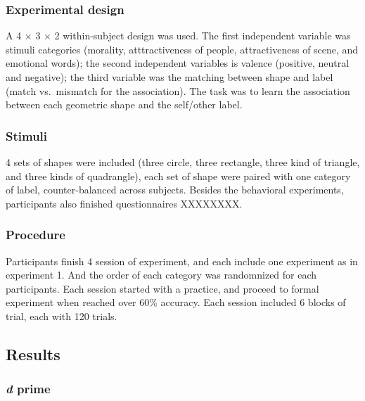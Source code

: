 \documentclass[man]{apa6}
\begin{document}
\hypertarget{experimental-design-2}{%
\subsubsection{Experimental design}\label{experimental-design-2}}

A 4 × 3 × 2 within-subject design was used. The first independent variable was stimuli categories (morality, atttractiveness of people, attractiveness of scene, and emotional words); the second independent variables is valence (positive, neutral and negative); the third variable was the matching between shape and label (match vs.~mismatch for the association). The task was to learn the association between each geometric shape and the self/other label.

\hypertarget{stimuli-3}{%
\subsubsection{Stimuli}\label{stimuli-3}}

4 sets of shapes were included (three circle, three rectangle, three kind of triangle, and three kinds of quadrangle), each set of shape were paired with one category of label, counter-balanced across subjects. Besides the behavioral experiments, participants also finished questionnaires XXXXXXXX.

\hypertarget{procedure-8}{%
\subsubsection{Procedure}\label{procedure-8}}

Participants finish 4 session of experiment, and each include one experiment as in experiment 1. And the order of each category was randomnized for each participants. Each session started with a practice, and proceed to formal experiment when reached over 60\% accuracy. Each session included 6 blocks of trial, each with 120 trials.

\hypertarget{results-8}{%
\subsection{Results}\label{results-8}}

\hypertarget{d-prime-1}{%
\subsubsection{\texorpdfstring{\emph{d} prime}{d prime}}\label{d-prime-1}}
\end{document}
